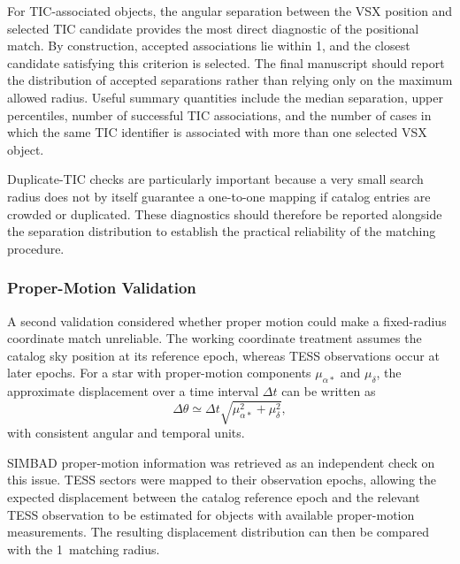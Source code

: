 \documentclass[linenumbers]{aastex701}
\begin{document}
For TIC-associated objects, the angular separation between the VSX position and selected TIC candidate provides the most direct diagnostic of the positional match. By construction, accepted associations lie within 1\arcsec, and the closest candidate satisfying this criterion is selected. The final manuscript should report the distribution of accepted separations rather than relying only on the maximum allowed radius. Useful summary quantities include the median separation, upper percentiles, number of successful TIC associations, and the number of cases in which the same TIC identifier is associated with more than one selected VSX object.

Duplicate-TIC checks are particularly important because a very small search radius does not by itself guarantee a one-to-one mapping if catalog entries are crowded or duplicated. These diagnostics should therefore be reported alongside the separation distribution to establish the practical reliability of the matching procedure.


\subsubsection{Proper-Motion Validation}
\label{subsubsec:proper_motion}

A second validation considered whether proper motion could make a fixed-radius coordinate match unreliable. The working coordinate treatment assumes the catalog sky position at its reference epoch, whereas TESS observations occur at later epochs. For a star with proper-motion components $\mu_{\alpha *}$ and $\mu_{\delta}$, the approximate displacement over a time interval $\Delta t$ can be written as
\begin{equation}
\Delta\theta \simeq
\Delta t\sqrt{\mu_{\alpha *}^{2}+\mu_{\delta}^{2}},
\label{eq:proper_motion_displacement}
\end{equation}
with consistent angular and temporal units.

SIMBAD proper-motion information was retrieved as an independent check on this issue. TESS sectors were mapped to their observation epochs, allowing the expected displacement between the catalog reference epoch and the relevant TESS observation to be estimated for objects with available proper-motion measurements. The resulting displacement distribution can then be compared with the 1\arcsec\ matching radius.
\end{document}
